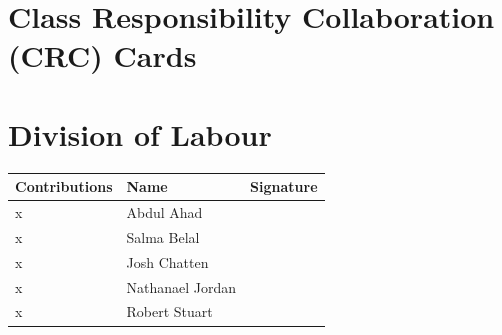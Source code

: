 \documentclass[titlepage,12pt]{article}
\begin{document}

    
\section{Class Responsibility Collaboration (CRC) Cards}
\label{sec:class_responsibility_collaboration_crc_cards}

%
%    


\newpage
\appendix
\section{Division of Labour}%
\label{sec:division_of_labour}

\begin{table}[htbp]
\vspace{-0.06in}
\begin{center}
\setlength{\extrarowheight}{4.0pt}
\begin{tabular}{m{} m{} m{}} 
\hline
\textbf{Contributions} & \textbf{Name} & \textbf{Signature}\\
\hline
x & Abdul Ahad & \\
\hline
x & Salma Belal & \\
\hline
x & Josh Chatten & \\
\hline
x & Nathanael Jordan  & \\
\hline
x & Robert Stuart & \\
\hline
\end{tabular}
\end{center}
\label{divOfLabour}
\end{table}
\end{document}
